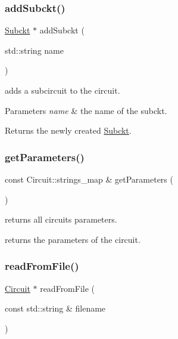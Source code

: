 \subsubsection{\texorpdfstring{add\+Subckt()}{addSubckt()}}
{\footnotesize\ttfamily \mbox{\hyperlink{class_s_p_i_c_e_1_1_subckt}{Subckt}} $\ast$ add\+Subckt (\begin{DoxyParamCaption}\item[{std\+::string}]{name }\end{DoxyParamCaption})}



adds a subcircuit to the circuit. 


\begin{DoxyParams}{Parameters}
{\em name} & the name of the subckt.\\
\hline
\end{DoxyParams}
\begin{DoxyReturn}{Returns}
the newly created \mbox{\hyperlink{class_s_p_i_c_e_1_1_subckt}{Subckt}}. 
\end{DoxyReturn}
\mbox{\label{class_s_p_i_c_e_1_1_circuit_a4c46676f9ead2db537a0dd963b4f08f1}} 
\subsubsection{\texorpdfstring{get\+Parameters()}{getParameters()}}
{\footnotesize\ttfamily const Circuit\+::strings\+\_\+map \& get\+Parameters (\begin{DoxyParamCaption}{ }\end{DoxyParamCaption})\hspace{0.3cm}{\ttfamily [inline]}}



returns all circuit\textquotesingle{}s parameters. 

returns the parameters of the circuit. \mbox{\label{class_s_p_i_c_e_1_1_circuit_aa8294fe7d9ceddb5653d08ecae3eaf36}} 
\subsubsection{\texorpdfstring{read\+From\+File()}{readFromFile()}}
{\footnotesize\ttfamily \mbox{\hyperlink{class_s_p_i_c_e_1_1_circuit}{Circuit}} $\ast$ read\+From\+File (\begin{DoxyParamCaption}\item[{const std\+::string \&}]{filename }\end{DoxyParamCaption})\hspace{0.3cm}{\ttfamily [static]}}




